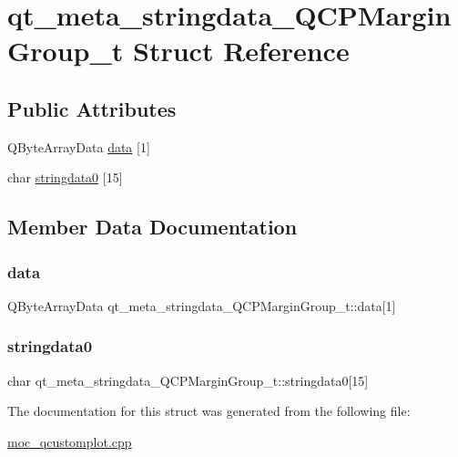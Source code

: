 \hypertarget{structqt__meta__stringdata__QCPMarginGroup__t}{}\section{qt\+\_\+meta\+\_\+stringdata\+\_\+\+Q\+C\+P\+Margin\+Group\+\_\+t Struct Reference}
\label{structqt__meta__stringdata__QCPMarginGroup__t}
\subsection*{Public Attributes}
\begin{DoxyCompactItemize}
\item 
Q\+Byte\+Array\+Data \mbox{\hyperlink{structqt__meta__stringdata__QCPMarginGroup__t_a99abe4f941bb7fbdfd988480fd5e6dc9}{data}} \mbox{[}1\mbox{]}
\item 
char \mbox{\hyperlink{structqt__meta__stringdata__QCPMarginGroup__t_aea2e8169d7b920f953fc3d240d03082b}{stringdata0}} \mbox{[}15\mbox{]}
\end{DoxyCompactItemize}


\subsection{Member Data Documentation}
\mbox{\label{structqt__meta__stringdata__QCPMarginGroup__t_a99abe4f941bb7fbdfd988480fd5e6dc9}} 
\subsubsection{\texorpdfstring{data}{data}}
{\footnotesize\ttfamily Q\+Byte\+Array\+Data qt\+\_\+meta\+\_\+stringdata\+\_\+\+Q\+C\+P\+Margin\+Group\+\_\+t\+::data\mbox{[}1\mbox{]}}

\mbox{\label{structqt__meta__stringdata__QCPMarginGroup__t_aea2e8169d7b920f953fc3d240d03082b}} 
\subsubsection{\texorpdfstring{stringdata0}{stringdata0}}
{\footnotesize\ttfamily char qt\+\_\+meta\+\_\+stringdata\+\_\+\+Q\+C\+P\+Margin\+Group\+\_\+t\+::stringdata0\mbox{[}15\mbox{]}}



The documentation for this struct was generated from the following file\+:\begin{DoxyCompactItemize}
\item 
\mbox{\hyperlink{moc__qcustomplot_8cpp}{moc\+\_\+qcustomplot.\+cpp}}\end{DoxyCompactItemize}

